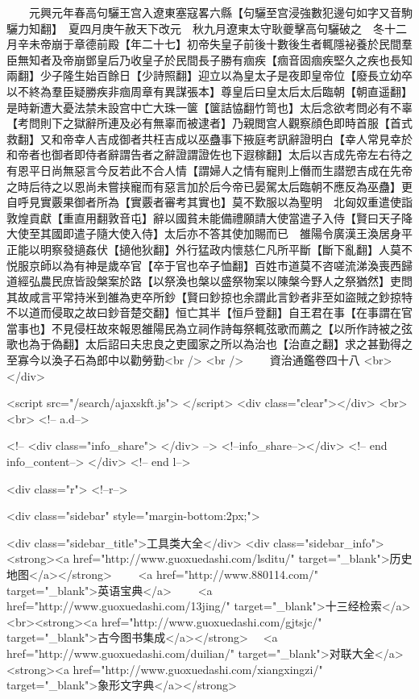 　　元興元年春高句驪王宫入遼東塞寇畧六縣【句驪至宫浸強數犯邊句如字又音駒驪力知翻】　夏四月庚午赦天下改元　秋九月遼東太守耿夔擊高句驪破之　冬十二月辛未帝崩于章德前殿【年二十七】初帝失皇子前後十數後生者輒隱袐養於民間羣臣無知者及帝崩鄧皇后乃收皇子於民間長子勝有痼疾【痼音固痼疾堅久之疾也長知兩翻】少子隆生始百餘日【少詩照翻】迎立以為皇太子是夜即皇帝位【廢長立幼卒以不終為羣臣疑勝疾非痼周章有異謀張本】尊皇后曰皇太后太后臨朝【朝直遥翻】是時新遭大憂法禁未設宫中亡大珠一箧【箧詰恊翻竹笥也】太后念欲考問必有不辜【考問則下之獄辭所連及必有無辜而被逮者】乃親閲宫人觀察顔色即時首服【首式救翻】又和帝幸人吉成御者共枉吉成以巫蠱事下掖庭考訊辭證明白【幸人常見幸於和帝者也御者即侍者辭謂告者之辭證謂證佐也下遐稼翻】太后以吉成先帝左右待之有恩平日尚無惡言今反若此不合人情【謂婦人之情有寵則上僭而生譛愬吉成在先帝之時后待之以恩尚未嘗挟寵而有惡言加於后今帝已晏駕太后臨朝不應反為巫蠱】更自呼見實覈果御者所為【實覈者審考其實也】莫不歎服以為聖明　北匈奴重遣使詣敦煌貢獻【重直用翻敦音屯】辭以國貧未能備禮願請大使當遣子入侍【賢曰天子降大使至其國即遣子隨大使入侍】太后亦不答其使加賜而已　雒陽令廣漢王渙居身平正能以明察發擿姦伏【擿他狄翻】外行猛政内懷慈仁凡所平斷【斷下亂翻】人莫不悦服京師以為有神是歲卒官【卒于官也卒子恤翻】百姓市道莫不咨嗟流涕渙喪西歸道經弘農民庶皆設槃案於路【以祭渙也槃以盛祭物案以陳槃今野人之祭猶然】吏問其故咸言平常持米到雒為吏卒所鈔【賢曰鈔掠也余謂此言鈔者非至如盜賊之鈔掠特不以道而侵取之故曰鈔音楚交翻】恒亡其半【恒戶登翻】自王君在事【在事謂在官當事也】不見侵枉故來報恩雒陽民為立祠作詩每祭輒弦歌而薦之【以所作詩被之弦歌也為于偽翻】太后詔曰夫忠良之吏國家之所以為治也【治直之翻】求之甚勤得之至寡今以渙子石為郎中以勸勞勤<br />
<br />
　　資治通鑑卷四十八  <br>
   </div> 

<script src="/search/ajaxskft.js"> </script>
 <div class="clear"></div>
<br>
<br>
 <!-- a.d-->

 <!--
<div class="info_share">
</div> 
-->
 <!--info_share--></div>   <!-- end info_content-->
  </div> <!-- end l-->

<div class="r">   <!--r-->



<div class="sidebar"  style="margin-bottom:2px;">

 
<div class="sidebar_title">工具类大全</div>
<div class="sidebar_info">
<strong><a href="http://www.guoxuedashi.com/lsditu/" target="_blank">历史地图</a></strong>　　
<a href="http://www.880114.com/" target="_blank">英语宝典</a>　　
<a href="http://www.guoxuedashi.com/13jing/" target="_blank">十三经检索</a>　
<br><strong><a href="http://www.guoxuedashi.com/gjtsjc/" target="_blank">古今图书集成</a></strong>　
<a href="http://www.guoxuedashi.com/duilian/" target="_blank">对联大全</a>　<strong><a href="http://www.guoxuedashi.com/xiangxingzi/" target="_blank">象形文字典</a></strong>　

